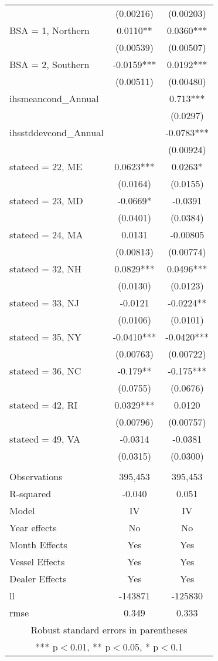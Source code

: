\begin{tabular}{lcc}
 & (0.00216) & (0.00203) \\
BSA = 1, Northern & 0.0110** & 0.0360*** \\
 & (0.00539) & (0.00507) \\
BSA = 2, Southern & -0.0159*** & 0.0192*** \\
 & (0.00511) & (0.00480) \\
ihsmeancond\_Annual &  & 0.713*** \\
 &  & (0.0297) \\
ihsstddevcond\_Annual &  & -0.0783*** \\
 &  & (0.00924) \\
statecd = 22, ME & 0.0623*** & 0.0263* \\
 & (0.0164) & (0.0155) \\
statecd = 23, MD & -0.0669* & -0.0391 \\
 & (0.0401) & (0.0384) \\
statecd = 24, MA & 0.0131 & -0.00805 \\
 & (0.00813) & (0.00774) \\
statecd = 32, NH & 0.0829*** & 0.0496*** \\
 & (0.0130) & (0.0123) \\
statecd = 33, NJ & -0.0121 & -0.0224** \\
 & (0.0106) & (0.0101) \\
statecd = 35, NY & -0.0410*** & -0.0420*** \\
 & (0.00763) & (0.00722) \\
statecd = 36, NC & -0.179** & -0.175*** \\
 & (0.0755) & (0.0676) \\
statecd = 42, RI & 0.0329*** & 0.0120 \\
 & (0.00796) & (0.00757) \\
statecd = 49, VA & -0.0314 & -0.0381 \\
 & (0.0315) & (0.0300) \\
 &  &  \\
Observations & 395,453 & 395,453 \\
R-squared & -0.040 & 0.051 \\
Model & IV & IV \\
Year effects & No & No \\
Month Effects & Yes & Yes \\
Vessel Effects & Yes & Yes \\
Dealer Effects & Yes & Yes \\
ll & -143871 & -125830 \\
 rmse & 0.349 & 0.333 \\ \hline
\multicolumn{3}{c}{ Robust standard errors in parentheses} \\
\multicolumn{3}{c}{ *** p$<$0.01, ** p$<$0.05, * p$<$0.1} \\
\end{tabular}

